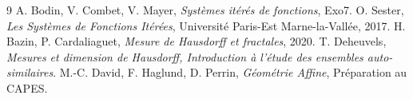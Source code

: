 \documentclass[11pt,a4paper]{article}
\begin{document}
\begin{thebibliography}{9}
 A. Bodin, V. Combet, V. Mayer, \textit{Systèmes itérés de fonctions}, Exo7.
 O. Sester, \textit{Les Systèmes de Fonctions Itérées}, Université Paris-Est Marne-la-Vallée, 2017.
 H. Bazin, P. Cardaliaguet, \textit{Mesure de Hausdorff et fractales}, 2020.
 T. Deheuvels, \textit{Mesures et dimension de Hausdorff, Introduction à l'étude des ensembles auto-similaires}.
 M.-C. David, F. Haglund, D. Perrin, \textit{Géométrie Affine}, Préparation au CAPES.
\end{thebibliography}
\end{document}
